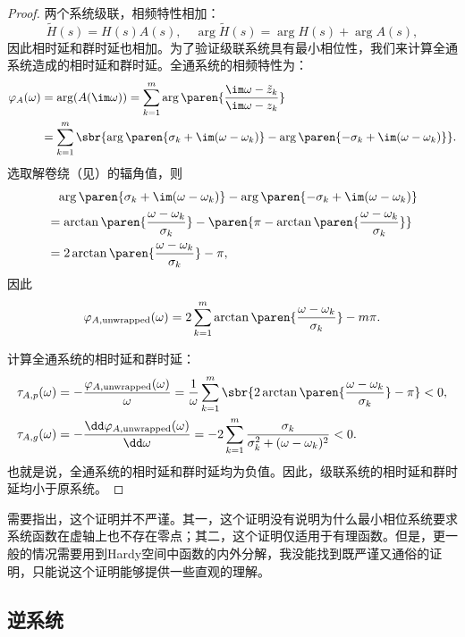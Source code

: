 \begin{proof}
    两个系统级联，相频特性相加：
    \begin{equation}
        \tilde{H}(s)=H(s)A(s),\quad \arg\tilde{H}(s)=\arg H(s)+\arg A(s),
    \end{equation}
    因此相时延和群时延也相加。为了验证级联系统具有最小相位性，我们来计算全通系统造成的相时延和群时延。全通系统的相频特性为：
    \begin{align}
        \varphi_A(\omega)&=\arg(A(\im\omega))=\sum_{k=1}^{m}\arg\paren{\frac{\im\omega-\tilde{z}_k}{\im\omega-z_k}}\nonumber\\
        &=\sum_{k=1}^m\sbr{\arg\paren{\sigma_k+\im(\omega-\omega_k)}-\arg\paren{-\sigma_k+\im(\omega-\omega_k)}}.
    \end{align}
    选取解卷绕（见）的辐角值，则
    \begin{align}
        &\phantom{=}\arg\paren{\sigma_k+\im(\omega-\omega_k)}-\arg\paren{-\sigma_k+\im(\omega-\omega_k)}\nonumber\\
        &=\arctan\paren{\frac{\omega-\omega_k}{\sigma_k}}-\paren{\pi-\arctan\paren{\frac{\omega-\omega_k}{\sigma_k}}}\nonumber\\
        &=2\arctan\paren{\frac{\omega-\omega_k}{\sigma_k}}-\pi,
    \end{align}
    因此
    \begin{equation}
        \varphi_{A,\text{unwrapped}}(\omega)=2\sum_{k=1}^m\arctan\paren{\frac{\omega-\omega_k}{\sigma_k}}-m\pi.
    \end{equation}

    计算全通系统的相时延和群时延：
    \begin{align}
        \tau_{A,p}(\omega)&=-\frac{\varphi_{A,\text{unwrapped}}(\omega)}{\omega}=\frac{1}{\omega}\sum_{k=1}^m\sbr{2\arctan\paren{\frac{\omega-\omega_k}{\sigma_k}}-\pi}<0,\\
        \tau_{A,g}(\omega)&=-\frac{\dd\varphi_{A,\text{unwrapped}}(\omega)}{\dd\omega}=-2\sum_{k=1}^m\frac{\sigma_k}{\sigma_k^2+(\omega-\omega_k)^2}<0.
    \end{align}
    也就是说，全通系统的相时延和群时延均为负值。因此，级联系统的相时延和群时延均小于原系统。
\end{proof}

需要指出，这个证明并不严谨。其一，这个证明没有说明为什么最小相位系统要求系统函数在虚轴上也不存在零点；其二，这个证明仅适用于有理函数。但是，更一般的情况需要用到Hardy空间中函数的内外分解，我没能找到既严谨又通俗的证明，只能说这个证明能够提供一些直观的理解。

\subsection{逆系统}\label{sub:inv_system}

